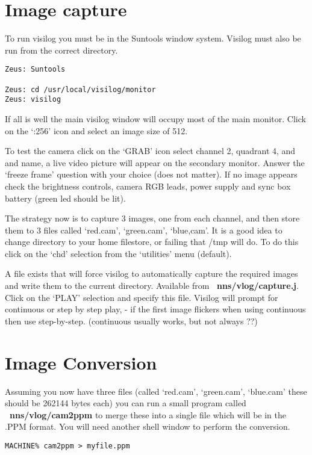 \section{Image capture}

To run visilog you must be in the Suntools window system. Visilog must
also be run from the correct directory.
\begin{verbatim}
Zeus: Suntools

Zeus: cd /usr/local/visilog/monitor
Zeus: visilog
\end{verbatim}

If all is well the main visilog window will occupy most of the main
monitor.  Click on the `:256' icon and select an image size of 512.

To test the camera click on the `GRAB' icon select channel 2, quadrant 4,
and and name, a live video picture will appear on the secondary monitor. 
Answer the `freeze frame' question with your choice (does not matter). 
If no image appears check the brightness controls, camera RGB leads,
power supply and sync box battery (green led should be lit). 

The strategy now is to capture 3 images, one from each channel, and
then store them to 3 files called `red.cam', `green.cam', `blue,cam'.
It is a good idea to change directory to your home filestore, or failing
that /tmp will do.  To do this click on the `chd' selection from the
`utilities' menu (default).

A file exists that will force visilog to automatically capture the 
required images and write them to the current directory.  Available
from {\bf ~nns/vlog/capture.j}. Click on the `PLAY' selection and specify
this file.  Visilog will prompt for continuous or step by step play, -
if the first image flickers when using continuous then use step-by-step.
(continuous usually works, but not always ??)

\section{Image Conversion}

Assuming you now have three files (called `red.cam', `green.cam', `blue.cam'
these should be 262144 bytes each) you can run a small program called
{\bf ~nns/vlog/cam2ppm} to merge these into a single file which will be 
in the .PPM
format.  You will need another shell window to perform the conversion.
\begin{verbatim}
MACHINE% cam2ppm > myfile.ppm
\end{verbatim}

